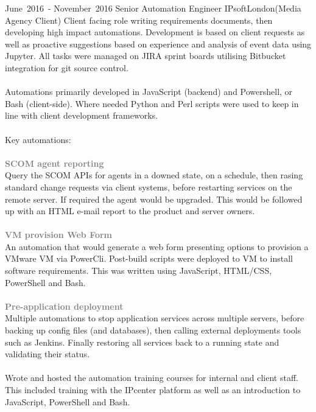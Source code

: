 \cventry %
  {\mbox{June 2016 -} \mbox{November 2016}}
  {Senior Automation Engineer}
  {IPsoft}{London}{(Media Agency Client)}
  {
    Client facing role writing requirements documents, then developing high impact automations. 
    Development is based on client requests as well as proactive suggestions based on experience 
    and analysis of event data using Jupyter.  All tasks were managed on JIRA sprint boards utilising 
    Bitbucket integration for git source control.\\~\\
    Automations primarily developed in JavaScript (backend) and Powershell, or Bash (client-side). 
    Where needed Python and Perl scripts were used to keep in line with client development frameworks.\\~\\
    Key automations:\\\\
    \textcolor{gray}{\textbf{SCOM agent reporting}}\\
    Query the SCOM APIs for agents in a downed state, on a schedule, 
    then rasing standard change requests via client systems, before restarting services on 
    the remote server. If required the agent would be upgraded. This would be followed up 
    with an HTML e-mail report to the product and server owners.\\\\
    \textcolor{gray}{\textbf{VM provision Web Form}}\\
    An automation that would generate a web form presenting options 
    to provision a VMware VM via PowerCli. Post-build scripts were deployed to VM to install 
    software requirements. This was written using JavaScript, HTML/CSS, PowerShell and Bash.\\\\
    \textcolor{gray}{\textbf{Pre-application deployment}}\\
    Multiple automations to stop application services across 
    multiple servers, before backing up config files (and databases), then calling external 
    deployments tools such as Jenkins. Finally restoring all services back to a running 
    state and validating their status.\\\\
    Wrote and hosted the automation training courses for internal and client staff. This included 
    training with the IPcenter platform as well as an introduction to JavaScript, PowerShell and Bash.\\
  }

